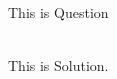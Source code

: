 This is Question
\begin{tcolorbox}
\begin{solution}\ \\
	This is Solution.
\end{solution}

\end{tcolorbox}